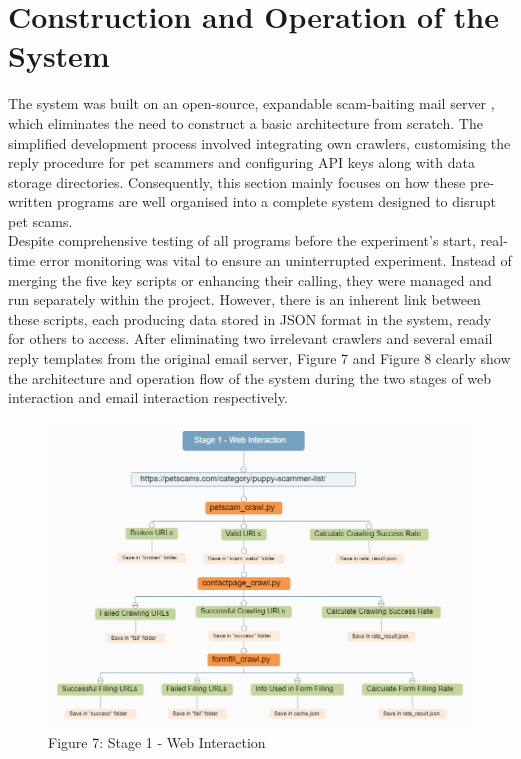 \documentclass[ oneside,%
                    author={Cassie Qing Tang},
                    degree={BSc},
                     title={An Automated Response System for Disrupting Online Pet Scamming \\ },
                    subtitle={ }]{dissertation}
\begin{document}
\section{Construction and Operation of the System}
The system was built on an open-source, expandable scam-baiting mail server \cite{an19352_an19352scambaiter_back_2023}, which eliminates the need to construct a basic architecture from scratch. The simplified development process involved integrating own crawlers, customising the reply procedure for pet scammers and configuring API keys along with data storage directories. Consequently, this section mainly focuses on how these pre-written programs are well organised into a complete system designed to disrupt pet scams.
\\

Despite comprehensive testing of all programs before the experiment's start, real-time error monitoring was vital to ensure an uninterrupted experiment. Instead of merging the five key scripts or enhancing their calling, they were managed and run separately within the project. However, there is an inherent link between these scripts, each producing data stored in JSON format in the system, ready for others to access. After eliminating two irrelevant crawlers and several email reply templates from the original email server, Figure 7 and Figure 8 clearly show the architecture and operation flow of the system during the two stages of web interaction and email interaction respectively.
\begin{figure}[H]
\centering
\includegraphics[width=0.8\linewidth]{pic/figure7.png}
\caption{Figure 7: Stage 1 - Web Interaction}
\label{fig:pic7}
\end{figure}
\end{document}
